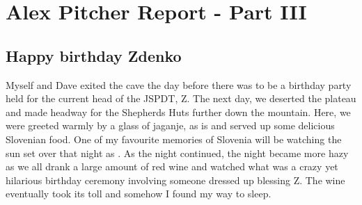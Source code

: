 \section{Alex Pitcher Report - Part III}

\subsection{Happy birthday Zdenko}

Myself and Dave exited the cave the day before there was to be a
birthday party held for the current head of the JSPDT, Z. The next day,
we deserted the plateau and made headway for the Shepherds Huts further
down the mountain. Here, we were greeted warmly by a glass of jaganje,
as is and served up some delicious Slovenian food. One of my favourite
memories of Slovenia will be watching the sun set over  that night
as . As the
night continued, the night became more hazy as we all drank a large
amount of red wine and watched what was a crazy yet hilarious birthday
ceremony involving someone dressed up blessing Z. The wine eventually
took its toll and somehow I found my way to sleep.

